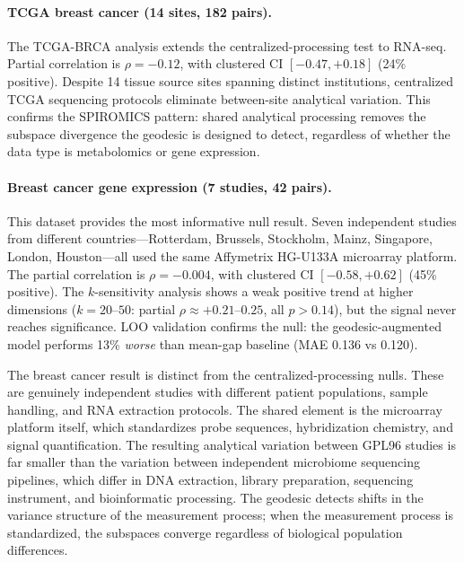 \documentclass{article}
\begin{document}
\paragraph{TCGA breast cancer (14 sites, 182 pairs).} The TCGA-BRCA analysis extends the centralized-processing test to RNA-seq. Partial correlation is $\rho = -0.12$, with clustered CI $[-0.47, +0.18]$ (24\% positive). Despite 14 tissue source sites spanning distinct institutions, centralized TCGA sequencing protocols eliminate between-site analytical variation. This confirms the SPIROMICS pattern: shared analytical processing removes the subspace divergence the geodesic is designed to detect, regardless of whether the data type is metabolomics or gene expression.

\paragraph{Breast cancer gene expression (7 studies, 42 pairs).} This dataset provides the most informative null result. Seven independent studies from different countries---Rotterdam, Brussels, Stockholm, Mainz, Singapore, London, Houston---all used the same Affymetrix HG-U133A microarray platform. The partial correlation is $\rho = -0.004$, with clustered CI $[-0.58, +0.62]$ (45\% positive). The $k$-sensitivity analysis shows a weak positive trend at higher dimensions ($k = 20$--$50$: partial $\rho \approx +0.21$--$0.25$, all $p > 0.14$), but the signal never reaches significance. LOO validation confirms the null: the geodesic-augmented model performs 13\% \emph{worse} than mean-gap baseline (MAE 0.136 vs 0.120).

The breast cancer result is distinct from the centralized-processing nulls. These are genuinely independent studies with different patient populations, sample handling, and RNA extraction protocols. The shared element is the microarray platform itself, which standardizes probe sequences, hybridization chemistry, and signal quantification. The resulting analytical variation between GPL96 studies is far smaller than the variation between independent microbiome sequencing pipelines, which differ in DNA extraction, library preparation, sequencing instrument, and bioinformatic processing. The geodesic detects shifts in the variance structure of the measurement process; when the measurement process is standardized, the subspaces converge regardless of biological population differences.
\end{document}

